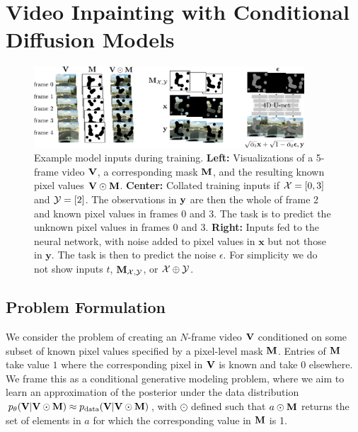 \chapter{Video Inpainting with Conditional Diffusion Models}
\label{sec:VICDM}

\begin{figure}[t]
    \centering
        \includegraphics[width=0.9\textwidth]{figures/architecture-overview/video-inpainting-overview.pdf}
    \caption{Example model inputs during training. \textbf{Left:} Visualizations of a 5-frame video $\mathbf{V}$, a corresponding mask $\mathbf{M}$, and the resulting known pixel values $\mathbf{V}\odot\mathbf{M}$. \textbf{Center:} Collated training inputs if $\mathcal{X} = [0, 3]$ and $\mathcal{Y} = [2]$. The observations in $\mathbf{y}$ are then the whole of frame 2 and known pixel values in frames 0 and 3. The task is to predict the unknown pixel values in frames 0 and 3. \textbf{Right:} Inputs fed to the neural network, with noise added to pixel values in $\mathbf{x}$ but not those in $\mathbf{y}$. The task is then to predict the noise $\epsilon$. For simplicity we do not show inputs $t$, $\mathbf{M}_{\mathcal{X},\mathcal{Y}}$, or $\mathcal{X}\oplus\mathcal{Y}$.}
    \label{fig:arch-and-training}
\end{figure}

\section{Problem Formulation}
We consider the problem of creating an $N$-frame video $\mathbf{V}$ conditioned on some subset of known pixel values specified by a pixel-level mask $\mathbf{M}$. Entries of $\mathbf{M}$ take value $1$ where the corresponding pixel in $\mathbf{V}$ is known and take $0$ elsewhere. We frame this as a conditional generative modeling problem, where we aim to learn an approximation of the posterior under the data distribution $p_\theta(\mathbf{V}|\mathbf{V} \odot \mathbf{M}) \approx p_\text{data}(\mathbf{V}|\mathbf{V} \odot \mathbf{M})$, with $\odot$ defined such that $a \odot \mathbf{M}$ returns the set of elements in $a$ for which the corresponding value in $\mathbf{M}$ is 1.


